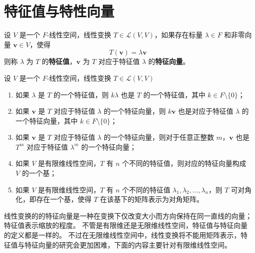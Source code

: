 \section{特征值与特性向量}

\begin{definition}
    设 $V$ 是一个 $F$-线性空间，线性变换 $T\in \mathcal{L}(V,V)$，如果存在标量 $\lambda\in F$ 和非零向量 $\mathbf{v}\in V$，使得
    \[
        T(\mathbf{v}) = \lambda \mathbf{v}
    \]
    则称 $\lambda$ 为 $T$ 的\textbf{特征值}，$\mathbf{v}$ 为 $T$ 对应于特征值 $\lambda$ 的\textbf{特征向量}。
    \label{def:eigenvalue_and_eigenvector}
\end{definition}

\begin{proposition}[特征值与特征向量的性质]
    设 $V$ 是一个 $F$-线性空间，线性变换 $T\in \mathcal{L}(V,V)$
    \begin{enumerate}
        \item 如果 $\lambda$ 是 $T$ 的一个特征值，则 $k\lambda$ 也是 $T$ 的一个特征值，其中 $k\in F\setminus \{0\}$；
        \item 如果 $\mathbf{v}$ 是 $T$ 对应于特征值 $\lambda$ 的一个特征向量，则 $k\mathbf{v}$ 也是对应于特征值 $\lambda$ 的一个特征向量，其中 $k\in F\setminus \{0\}$；
        \item 如果 $\mathbf{v}$ 是 $T$ 对应于特征值 $\lambda$ 的一个特征向量，则对于任意正整数 $m$，$\mathbf{v}$ 也是 $T^m$ 对应于特征值 $\lambda^m$ 的一个特征向量；
        \item 如果 $V$ 是有限维线性空间，$T$ 有 $n$ 个不同的特征值，则对应的特征向量构成 $V$ 的一个基；
        \item 如果 $V$ 是有限维线性空间，$T$ 有 $n$ 个不同的特征值 $\lambda_1,\lambda_2,\ldots,\lambda_n$，则 $T$ 可对角化，即存在一个基，使得 $T$ 在该基下的矩阵表示为对角矩阵。
    \end{enumerate}
\end{proposition}

\begin{note}
    线性变换的的特征向量是一种在变换下仅改变大小而方向保持在同一直线的向量；特征值表示缩放的程度。
    不管是有限维还是无限维线性空间，特征值与特征向量的定义都是一样的。
    不过在无限维线性空间中，线性变换将不能用矩阵表示，特征值与特征向量的研究会更加困难，下面的内容主要针对有限维线性空间。
\end{note}

\vspace{1em}

